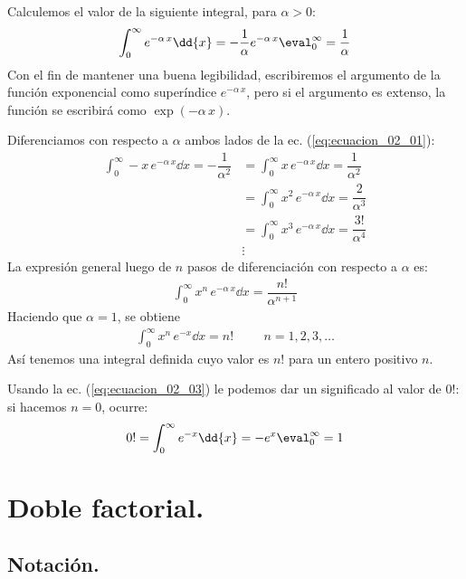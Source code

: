 Calculemos el valor de la siguiente integral, para $\alpha > 0$:
\begin{align}
\int_{0}^{\infty} e^{-\alpha \, x} \dd{x} = - \dfrac{1}{\alpha} e^{-\alpha \, x}\eval_{0}^{\infty} = \dfrac{1}{\alpha}
\label{eq:ecuacion_02_01}
\end{align}
Con el fin de mantener una buena legibilidad, escribiremos el argumento de la función exponencial como superíndice $e^{-\alpha \, x}$, pero si el argumento es extenso, la función se escribirá como $\exp(-\alpha \, x)$.
\par
Diferenciamos con respecto a $\alpha$ ambos lados de la ec. (\ref{eq:ecuacion_02_01}):
\begin{align*}
\int_{0}^{\infty} - x \, e^{-\alpha \, x} \dd{x} = - \dfrac{1}{\alpha^{2}} &= \int_{0}^{\infty} x \, e^{-\alpha \, x} \dd{x} = \dfrac{1}{\alpha^{2}} \\[0.5em]
&= \int_{0}^{\infty} x^{2} \, e^{-\alpha \, x} \dd{x} = \dfrac{2}{\alpha^{3}} \\[0.5em]
&= \int_{0}^{\infty} x^{3} \, e^{-\alpha \, x} \dd{x} = \dfrac{3!}{\alpha^{4}} \\
& \vdots
\end{align*}
La expresión general luego de $n$ pasos de diferenciación con respecto a $\alpha$ es:
\begin{align}
\int_{0}^{\infty} x^{n} \, e^{-\alpha \, x} \dd{x} = \dfrac{n!}{\alpha^{n+1}}
\label{eq:ecuacion_02_02}
\end{align}
Haciendo que $\alpha = 1$, se obtiene
\begin{align}
\int_{0}^{\infty} x^{n} \, e^{-x} \dd{x} = n! \hspace{1cm} n = 1, 2, 3, \ldots
\label{eq:ecuacion_02_03}
\end{align}
Así tenemos una integral definida cuyo valor es $n!$ para un entero positivo $n$.
\par
Usando la ec. (\ref{eq:ecuacion_02_03}) le podemos dar un significado al valor de $0!$: si hacemos $n = 0$, ocurre:
\begin{align}
0! = \int_{0}^{\infty} e^{-x} \dd{x} = -e^{x}\eval_{0}^{\infty} = 1
\label{eq:ecuacion_02_04}
\end{align}

\section{Doble factorial.}

\subsection{Notación.}

